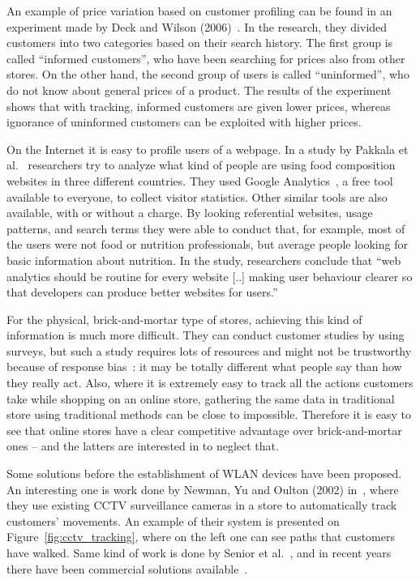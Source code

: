 \documentclass[12pt,a4paper,oneside,pdftex]{report}
\begin{document}
An example of price variation based on customer profiling can be found in an experiment made by Deck and Wilson (2006)~\cite{Deck2006}. In the research, they divided customers into two categories based on their search history. The first group is called ``informed customers'', who have been searching for prices also from other stores. On the other hand, the second group of users is called ``uninformed'', who do not know about general prices of a product. The results of the experiment shows that with tracking, informed customers are given lower prices, whereas ignorance of uninformed customers can be exploited with higher prices.

On the Internet it is easy to profile users of a webpage. In a study by Pakkala et al.~\cite{Pakkala2012504} researchers try to analyze what kind of people are using food composition websites in three different countries. They used Google Analytics~\cite{googleanalytics}, a free tool available to everyone, to collect visitor statistics. Other similar tools are also available, with or without a charge. By looking referential websites, usage patterns, and search terms they were able to conduct that, for example, most of the users were not food or nutrition professionals, but average people looking for basic information about nutrition. In the study, researchers conclude that ``web analytics should be routine for every website [..] making user behaviour clearer so that developers can produce better websites for users.''

For the physical, brick-and-mortar type of stores, achieving this kind of information is much more difficult. They can conduct customer studies by using surveys, but such a study requires lots of resources and might not be trustworthy because of response bias~\cite{Furnham1986385}: it may be totally different what people say than how they really act. Also, where it is extremely easy to track all the actions customers take while shopping on an online store, gathering the same data in traditional store using traditional methods can be close to impossible. Therefore it is easy to see that online stores have a clear competitive advantage over brick-and-mortar ones -- and the latters are interested in to neglect that.

Some solutions before the establishment of WLAN devices have been proposed. An interesting one is work done by Newman, Yu and Oulton (2002) in~\cite{Newman2002253}, where they use existing CCTV surveillance cameras in a store to automatically track customers' movements. An example of their system is presented on Figure~\ref{fig:cctv_tracking}, where on the left one can see paths that customers have walked. Same kind of work is done by Senior et al.~\cite{senior2007video}, and in recent years there have been commercial solutions available~\cite{retailcctv}.
\end{document}
